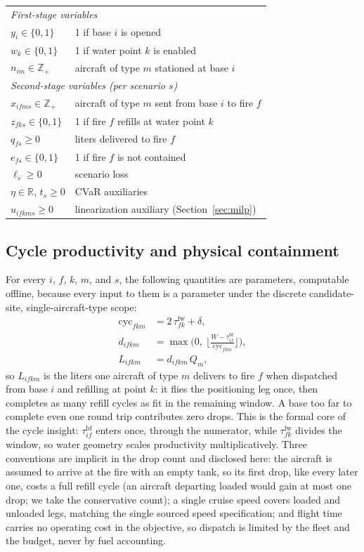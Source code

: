 \documentclass[11pt]{article}
\begin{document}
\begin{table}[!htbp]
\begin{tabular}{ll}
\midrule
\multicolumn{2}{l}{\emph{First-stage variables}} \\
$y_i \in \{0,1\}$ & 1 if base $i$ is opened \\
$w_k \in \{0,1\}$ & 1 if water point $k$ is enabled \\
$n_{im} \in \mathbb{Z}_{+}$ & aircraft of type $m$ stationed at base $i$ \\
\midrule
\multicolumn{2}{l}{\emph{Second-stage variables (per scenario $s$)}} \\
$x_{ifms} \in \mathbb{Z}_{+}$ & aircraft of type $m$ sent from base $i$ to fire $f$ \\
$z_{fks} \in \{0,1\}$ & 1 if fire $f$ refills at water point $k$ \\
$q_{fs} \ge 0$ & liters delivered to fire $f$ \\
$e_{fs} \in \{0,1\}$ & 1 if fire $f$ is not contained \\
$\ell_s \ge 0$ & scenario loss \\
$\eta \in \mathbb{R}$, $t_s \ge 0$ & CVaR auxiliaries \\
$u_{ifkms} \ge 0$ & linearization auxiliary (Section~\ref{sec:milp}) \\
\bottomrule
\end{tabular}
\end{table}

\subsection{Cycle productivity and physical containment}

For every $i$, $f$, $k$, $m$, and $s$, the following quantities are
parameters, computable offline, because every input to them is a
parameter under the discrete candidate-site, single-aircraft-type
scope:
\begin{align}
\mathrm{cyc}_{fkm} &= 2\,\tau^{\mathrm{fw}}_{fk} + \delta, \\
d_{ifkm} &= \max\!\Big(0,\ \Big\lfloor \tfrac{W - \tau^{\mathrm{bf}}_{if}}{\mathrm{cyc}_{fkm}} \Big\rfloor\Big), \\
L_{ifkm} &= d_{ifkm}\, Q_m,
\end{align}
so $L_{ifkm}$ is the liters one aircraft of type $m$ delivers to fire
$f$ when dispatched from base $i$ and refilling at point $k$: it flies
the positioning leg once, then completes as many refill cycles as fit
in the remaining window. A base too far to complete even one round trip
contributes zero drops. This is the formal core of the cycle insight:
$\tau^{\mathrm{bf}}_{if}$ enters once, through the numerator, while
$\tau^{\mathrm{fw}}_{fk}$ divides the window, so water geometry scales
productivity multiplicatively. Three conventions are implicit in the
drop count and disclosed here: the aircraft is assumed to arrive at the
fire with an empty tank, so its first drop, like every later one, costs
a full refill cycle (an aircraft departing loaded would gain at most
one drop; we take the conservative count); a single cruise speed
covers loaded and unloaded legs, matching the single sourced speed
specification; and flight time carries no operating cost in the
objective, so dispatch is limited by the fleet and the budget, never
by fuel accounting.
\end{document}
